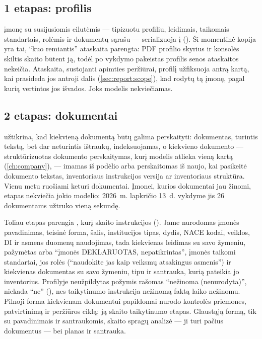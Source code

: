 \subsection{1 etapas: profilis}

 įmonę su susijusiomis eilutėmis --- tipizuotu profiliu, leidimais,
taikomais standartais, rolėmis ir dokumentų sąrašu --- serializuoja į
 (). Ši momentinė kopija yra tai, \enquote{kuo remiantis} ataskaita
parengta: PDF profilio skyrius ir konsolės skiltis  skaito būtent ją, todėl
po vykdymo pakeistas profilis senos ataskaitos nekeičia. Ataskaita, sustojanti apimties
peržiūrai, profilį užfiksuoja antrą kartą, kai prasideda jos antroji dalis
(\cref{sec:report:scope}), kad rodytų tą įmonę, pagal kurią vertintos jos išvados. Joks modelis
nekviečiamas.

\subsection{2 etapas: dokumentai}

 užtikrina, kad kiekvieną dokumentą būtų galima perskaityti: dokumentas,
turintis tekstą, bet dar neturintis ištraukų, indeksuojamas, o kiekvieno dokumento
 --- struktūrizuotas dokumento perskaitymas, kurį modelis atlieka vieną kartą
(\cref{ch:company}), --- imamas iš podėlio arba perskaitomas iš naujo, kai pasikeitė dokumento
tekstas, inventoriaus instrukcijos versija ar inventoriaus struktūra. Vienu metu ruošiami keturi
dokumentai. Įmonei, kurios dokumentai jau žinomi, etapas nekviečia jokio modelio: 2026~m.
lapkričio 13~d. vykdyme jis 26 dokumentams užtruko vieną sekundę.

Toliau etapas parengia , kurį skaito instrukcijos ().
Jame nurodomas įmonės pavadinimas, teisinė forma, šalis, institucijos tipas, dydis, NACE kodai,
veiklos, DI ir asmens duomenų naudojimas, tada kiekvienas leidimas su savo žymeniu, pažymėtas
 arba \enquote{įmonės DEKLARUOTAS, nepatikrintas}, įmonės taikomi standartai, jos
rolės (\enquote{naudokite jas kaip veiksmų atsakingus asmenis}) ir kiekvienas dokumentas su
savo žymeniu, tipu ir santrauka, kurią pateikia jo inventorius. Profilyje neužpildytas požymis
rašomas \enquote{nežinoma (nenurodyta)}, niekada \enquote{ne} (), nes taikytinumo
instrukcija nežinomą faktą laiko nežinomu. Pilnoji forma kiekvienam dokumentui papildomai
nurodo kontrolės priemones, patvirtinimą ir peržiūros ciklą; ją skaito taikytinumo etapas.
Glaustąją formą, tik su pavadinimais ir santraukomis, skaito spragų analizė --- ji turi pačius
dokumentus --- bei planas ir santrauka.

